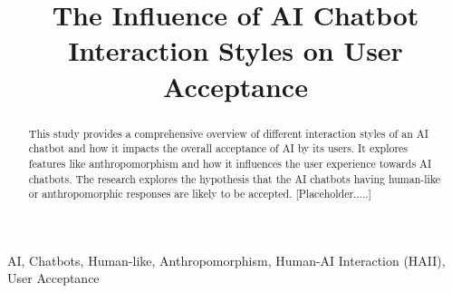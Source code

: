 \documentclass[conference]{IEEEtran}
\begin{document}
\title{The Influence of AI Chatbot Interaction Styles on User Acceptance}

\author{
	}

\maketitle

\begin{abstract}
	This study provides a comprehensive overview of different interaction styles of an AI chatbot and how it impacts the overall acceptance of AI by its users. It explores features like anthropomorphism and how it influences the user experience towards AI chatbots. The research explores the hypothesis that the AI chatbots having human-like or anthropomorphic responses are likely to be accepted. [Placeholder.....]
\end{abstract}

\begin{IEEEkeywords}
	AI, Chatbots, Human-like, Anthropomorphism, Human-AI Interaction (HAII), User Acceptance
\end{IEEEkeywords}
\end{document}
